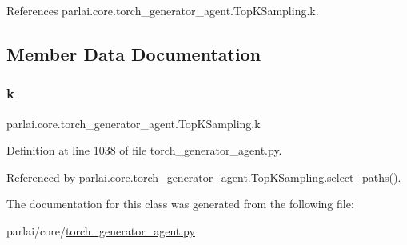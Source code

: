 References parlai.\+core.\+torch\+\_\+generator\+\_\+agent.\+Top\+K\+Sampling.\+k.



\subsection{Member Data Documentation}
\mbox{\label{classparlai_1_1core_1_1torch__generator__agent_1_1TopKSampling_a69d2f8e711e51151aa6649a4889e8243}} 
\subsubsection{\texorpdfstring{k}{k}}
{\footnotesize\ttfamily parlai.\+core.\+torch\+\_\+generator\+\_\+agent.\+Top\+K\+Sampling.\+k}



Definition at line 1038 of file torch\+\_\+generator\+\_\+agent.\+py.



Referenced by parlai.\+core.\+torch\+\_\+generator\+\_\+agent.\+Top\+K\+Sampling.\+select\+\_\+paths().



The documentation for this class was generated from the following file\+:\begin{DoxyCompactItemize}
\item 
parlai/core/\hyperlink{torch__generator__agent_8py}{torch\+\_\+generator\+\_\+agent.\+py}\end{DoxyCompactItemize}
